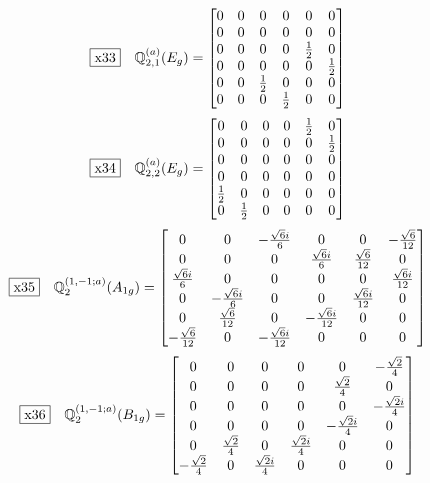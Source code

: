 \documentclass[fleqn,10pt,landscape]{jsarticle}
\begin{document}
\begin{dmath*}
\fbox{x33}\quad \mathbb{Q}_{2,1}^{(a)}(E_{g})=\begin{bmatrix} 0 & 0 & 0 & 0 & 0 & 0 \\ 0 & 0 & 0 & 0 & 0 & 0 \\ 0 & 0 & 0 & 0 & \frac{1}{2} & 0 \\ 0 & 0 & 0 & 0 & 0 & \frac{1}{2} \\ 0 & 0 & \frac{1}{2} & 0 & 0 & 0 \\ 0 & 0 & 0 & \frac{1}{2} & 0 & 0 \end{bmatrix}
\end{dmath*}
\begin{dmath*}
\fbox{x34}\quad \mathbb{Q}_{2,2}^{(a)}(E_{g})=\begin{bmatrix} 0 & 0 & 0 & 0 & \frac{1}{2} & 0 \\ 0 & 0 & 0 & 0 & 0 & \frac{1}{2} \\ 0 & 0 & 0 & 0 & 0 & 0 \\ 0 & 0 & 0 & 0 & 0 & 0 \\ \frac{1}{2} & 0 & 0 & 0 & 0 & 0 \\ 0 & \frac{1}{2} & 0 & 0 & 0 & 0 \end{bmatrix}
\end{dmath*}
\begin{dmath*}
\fbox{x35}\quad \mathbb{Q}_{2}^{(1,-1;a)}(A_{1g})=\begin{bmatrix} 0 & 0 & - \frac{\sqrt{6} i}{6} & 0 & 0 & - \frac{\sqrt{6}}{12} \\ 0 & 0 & 0 & \frac{\sqrt{6} i}{6} & \frac{\sqrt{6}}{12} & 0 \\ \frac{\sqrt{6} i}{6} & 0 & 0 & 0 & 0 & \frac{\sqrt{6} i}{12} \\ 0 & - \frac{\sqrt{6} i}{6} & 0 & 0 & \frac{\sqrt{6} i}{12} & 0 \\ 0 & \frac{\sqrt{6}}{12} & 0 & - \frac{\sqrt{6} i}{12} & 0 & 0 \\ - \frac{\sqrt{6}}{12} & 0 & - \frac{\sqrt{6} i}{12} & 0 & 0 & 0 \end{bmatrix}
\end{dmath*}
\begin{dmath*}
\fbox{x36}\quad \mathbb{Q}_{2}^{(1,-1;a)}(B_{1g})=\begin{bmatrix} 0 & 0 & 0 & 0 & 0 & - \frac{\sqrt{2}}{4} \\ 0 & 0 & 0 & 0 & \frac{\sqrt{2}}{4} & 0 \\ 0 & 0 & 0 & 0 & 0 & - \frac{\sqrt{2} i}{4} \\ 0 & 0 & 0 & 0 & - \frac{\sqrt{2} i}{4} & 0 \\ 0 & \frac{\sqrt{2}}{4} & 0 & \frac{\sqrt{2} i}{4} & 0 & 0 \\ - \frac{\sqrt{2}}{4} & 0 & \frac{\sqrt{2} i}{4} & 0 & 0 & 0 \end{bmatrix}
\end{dmath*}
\end{document}
